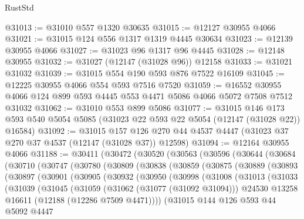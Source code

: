 \begin{lexlean}{RustStd}
\begin{coremodule}
@31013 := @31010 @557 @1320 @30635
@31015 := @12127 @30955 @4066
@31021 := @31015 @124 @556 @1317 @1319 @4445 @30634
@31023 := @12139 @30955 @4066
@31027 := @31023 @96 @1317 @96 @4445
@31028 := @12148 @30955
@31032 := @31027 (@12147 (@31028 @96)) @12158
@31033 := @31021 @31032
@31039 := @31015 @554 @190 @593 @876 @7522 @16109
@31045 := @12225 @30955 @4066 @554 @593 @7516 @7520
@31059 := @16552 @30955 @4066 @124 @899 @593 @4445 @553 @4471 @5086 @4066 @5072 @7508 @7512 @31032
@31062 := @31010 @553 @899 @5086
@31077 := @31015
    @146
    @173
    @593
    @540
    @5054
    @5085
    (@31023 @22 @593 @22 @5054 (@12147 (@31028 @22)) @16584)
@31092 := @31015
    @157
    @126
    @270
    @44
    @4537
    @4447
    (@31023 @37 @270 @37 @4537 (@12147 (@31028 @37)) @12598)
@31094 := @12164 @30955 @4066
@31188 := @30411
    (@30472
      (@30520
        (@30563
          (@30596
            (@30644
              (@30684
                (@30710
                  (@30747
                    (@30780
                      (@30809
                        (@30838
                          (@30859
                            (@30875
                              (@30889
                                (@30893
                                  (@30897
                                    (@30901
                                      (@30905
                                        (@30932
                                          (@30950
                                            (@30998
                                              (@31008
                                                (@31013
                                                  (@31033
                                                    (@31039
                                                      (@31045
                                                        (@31059
                                                          (@31062 (@31077 (@31092 @31094)))
                                                          @24530
                                                          @13258
                                                          @16611
                                                          (@12188 (@12286 @7509 @4471))))
                                                      (@31015
                                                        @144
                                                        @126
                                                        @593
                                                        @44
                                                        @5092
                                                        @4447

\end{coremodule}
\end{lexlean}
